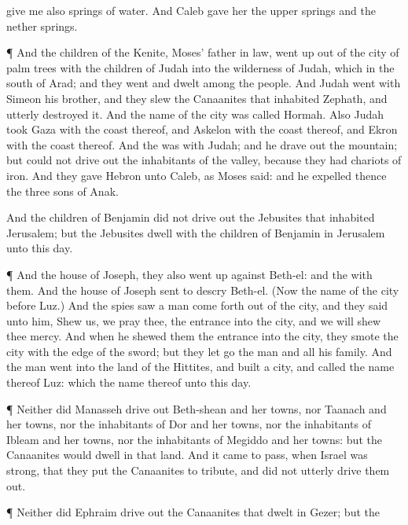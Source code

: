 {give me also
springs of
water. And
Caleb
gave her the
upper
springs and the
nether
springs.
\par }{\PP {}¶ And the
children of the
Kenite,
Moses’ father in
law, went
up out of the
city of palm
trees with the
children of
Judah into the
wilderness of
Judah, which
{} in the
south of
Arad; and they
went and
dwelt
among the
people.
And
Judah
went with
Simeon his
brother, and they
slew the
Canaanites that
inhabited
Zephath, and utterly
destroyed it. And the
name of the
city was
called
Hormah.
Also
Judah
took
Gaza with the
coast thereof, and
Askelon with the
coast thereof, and
Ekron with the
coast thereof.
And the
{} was with
Judah; and he drave
out
{} the
mountain; but could
not drive
out the
inhabitants of the
valley, because they had
chariots of
iron.
And they
gave
Hebron unto
Caleb, as
Moses
said: and he
expelled thence the
three
sons of
Anak.
\par }{\PP {}And the
children of
Benjamin did not drive
out the
Jebusites that
inhabited
Jerusalem; but the
Jebusites
dwell with the
children of
Benjamin in
Jerusalem unto this
day.
\par }{\PP {}¶ And the
house of
Joseph, they also went
up against
Beth-el: and the
{}
{} with them.
And the
house of
Joseph sent to
descry
Beth-el. (Now the
name of the
city
before
{}
Luz.)
And the
spies
saw a
man come
forth out of the
city, and they
said unto him,
Shew us, we pray thee, the
entrance into the
city, and we will
shew thee
mercy.
And when he
shewed them the
entrance into the
city, they
smote the
city with the
edge of the
sword; but they let
go the
man and all his
family.
And the
man
went into the
land of the
Hittites, and
built a
city, and
called the
name thereof
Luz: which
{} the
name thereof unto this
day.
\par }{\PP {}¶ Neither did
Manasseh drive
out
{}
Beth-shean and her
towns, nor
Taanach and her
towns, nor the
inhabitants of
Dor and her
towns, nor the
inhabitants of
Ibleam and her
towns, nor the
inhabitants of
Megiddo and her
towns: but the
Canaanites
would
dwell in that
land.
And it came to pass, when
Israel was
strong, that they
put the
Canaanites to
tribute, and did not
utterly drive them
out.
\par }{\PP {}¶ Neither did
Ephraim drive
out the
Canaanites that
dwelt in
Gezer; but the
}
